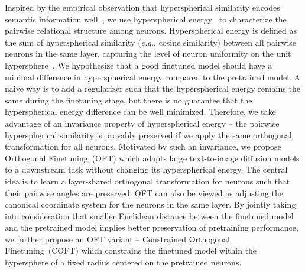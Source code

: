 Inspired by the empirical observation that hyperspherical similarity encodes semantic information well~\cite{liu2017deep,liu2018decoupled,chen2020angular}, we use hyperspherical energy~\cite{liu2018learning} to characterize the pairwise relational structure among neurons. Hyperspherical energy is defined as the sum of hyperspherical similarity (\emph{e.g.}, cosine similarity) between all pairwise neurons in the same layer, capturing the level of neuron uniformity on the unit hypersphere~\cite{liu2021learning}. We hypothesize that a good finetuned model should have a minimal difference in hyperspherical energy compared to the pretrained model. A naive way is to add a regularizer such that the hyperspherical energy remains the same during the finetuning stage, but there is no guarantee that the hyperspherical energy difference can be well minimized. Therefore, we take advantage of an invariance property of hyperspherical energy -- the pairwise hyperspherical similarity is provably preserved if we apply the same orthogonal transformation for all neurons. Motivated by such an invariance, we propose Orthogonal Finetuning~(OFT) which adapts large text-to-image diffusion models to a downstream task without changing its hyperspherical energy. The central idea is to learn a layer-shared orthogonal transformation for neurons such that their pairwise angles are preserved. OFT can also be viewed as adjusting the canonical coordinate system for the neurons in the same layer. By jointly taking into consideration that smaller Euclidean distance between the finetuned model and the pretrained model implies better preservation of pretraining performance, we further propose an OFT variant -- Constrained Orthogonal Finetuning~(COFT) which constrains the finetuned model within the hypersphere of a fixed radius centered on the pretrained neurons.


